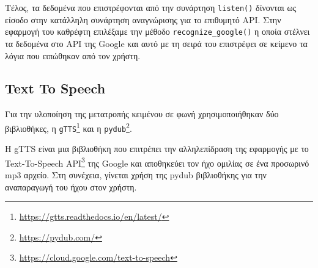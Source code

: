 Τέλος, τα δεδομένα που επιστρέφονται από την συνάρτηση \texttt{listen()} δίνονται ως είσοδο στην κατάλληλη συνάρτηση αναγνώρισης για το επιθυμητό API. Στην εφαρμογή του καθρέφτη επιλέξαμε την μέθοδο \texttt{recognize\_google()} η οποία στέλνει τα δεδομένα στο API της Google και αυτό με τη σειρά του επιστρέφει σε κείμενο τα λόγια που ειπώθηκαν από τον χρήστη.

\subsection{Text To Speech}
Για την υλοποίηση της μετατροπής κειμένου σε φωνή χρησιμοποιήθηκαν δύο βιβλιοθήκες, η \texttt{gTTS}\footnote{\href{https://gtts.readthedocs.io/en/latest}{https://gtts.readthedocs.io/en/latest/}} και η \texttt{pydub}\footnote{\href{https://pydub.com/}{https://pydub.com/}}.

Η gTTS είναι μια βιβλιοθήκη που επιτρέπει την αλληλεπίδραση της εφαρμογής με το Text-To-Speech API\footnote{\href{https://cloud.google.com/text-to-speech}{https://cloud.google.com/text-to-speech}} της Google και αποθηκεύει τον ήχο ομιλίας σε ένα προσωρινό mp3 αρχείο. Στη συνέχεια, γίνεται χρήση της pydub βιβλιοθήκης για την αναπαραγωγή του ήχου στον χρήστη.